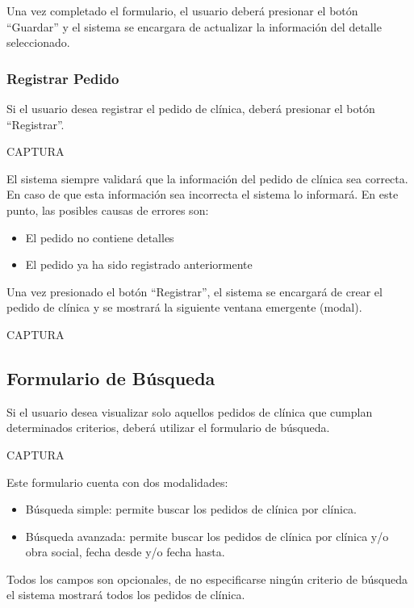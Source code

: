 \documentclass[letterpaper,10pt,spanish]{sphinxmanual}
\begin{document}
Una vez completado el formulario, el usuario deberá presionar el botón “Guardar” y el sistema se encargara de actualizar la información del detalle seleccionado.


\subsubsection{Registrar Pedido}
\label{pedidosclinica:registrar-pedido}
Si el usuario desea registrar el pedido de clínica, deberá presionar el botón “Registrar”.

CAPTURA

El sistema siempre validará que la información del pedido de clínica sea correcta. En caso de que esta información sea incorrecta el sistema lo informará.
En este punto, las posibles causas de errores son:
\begin{itemize}
\item {} 
El pedido no contiene detalles

\item {} 
El pedido ya ha sido registrado anteriormente

\end{itemize}

Una vez presionado el botón “Registrar”, el sistema se encargará de crear el pedido de clínica y se mostrará la siguiente ventana emergente (modal).

CAPTURA


\subsection{Formulario de Búsqueda}
\label{pedidosclinica:formulario-de-busqueda}
Si el usuario desea visualizar solo aquellos pedidos de clínica que cumplan determinados criterios, deberá utilizar el formulario de búsqueda.

CAPTURA

Este formulario cuenta con dos modalidades:
\begin{itemize}
\item {} 
Búsqueda simple: permite buscar los pedidos de clínica por clínica.

\item {} 
Búsqueda avanzada: permite buscar los pedidos de clínica por clínica y/o obra social, fecha desde y/o fecha hasta.

\end{itemize}

Todos los campos son opcionales, de no especificarse ningún criterio de búsqueda el sistema mostrará todos los pedidos de clínica.
\end{document}
